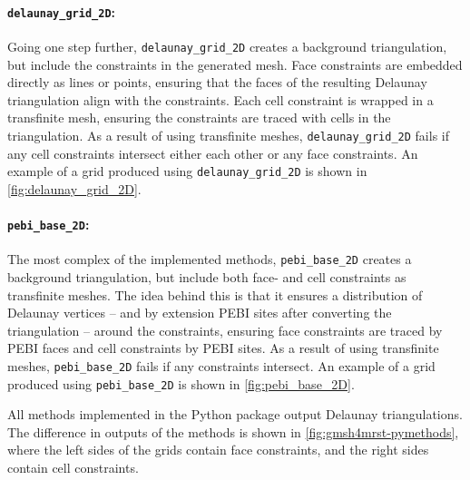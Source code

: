 \paragraph{\texttt{delaunay\_grid\_2D}:}
Going one step further, \verb|delaunay_grid_2D| creates a background triangulation, but include the constraints in the generated mesh. Face constraints are embedded directly as lines or points, ensuring that the faces of the resulting Delaunay triangulation align with the constraints. Each cell constraint is wrapped in a transfinite mesh, ensuring the constraints are traced with cells in the triangulation. As a result of using transfinite meshes, \verb|delaunay_grid_2D| fails if any cell constraints intersect either each other or any face constraints. An example of a grid produced using \verb|delaunay_grid_2D| is shown in \autoref{fig:delaunay_grid_2D}.

\paragraph{\texttt{pebi\_base\_2D}:}
The most complex of the implemented methods, \verb|pebi_base_2D| creates a background triangulation, but include both face- and cell constraints as transfinite meshes. The idea behind this is that it ensures a distribution of Delaunay vertices -- and by extension PEBI sites after converting the triangulation -- around the constraints, ensuring face constraints are traced by PEBI faces and cell constraints by PEBI sites. As a result of using transfinite meshes, \verb|pebi_base_2D| fails if any constraints intersect. An example of a grid produced using \verb|pebi_base_2D| is shown in \autoref{fig:pebi_base_2D}.

All methods implemented in the Python package output Delaunay triangulations. The difference in outputs of the methods is shown in \autoref{fig:gmsh4mrst-pymethods}, where the left sides of the grids contain face constraints, and the right sides contain cell constraints.


